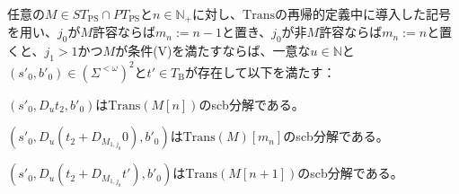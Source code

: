\documentclass[dvipdfmx,uplatex]{jsarticle}
\theoremstyle{customnonumberbreakfortheorem}
\theoremstyle{customnonumberbreakforproof}
\begin{document}
\begin{lemma}[条件(V)の下での基本列のscb分解]\label{条件(V)の下での基本列のscb分解}
	任意の\(M \in ST_{\textrm{PS}} \cap PT_{\textrm{PS}}\)と\(n \in \mathbb{N}_{+}\)に対し、\(\textrm{Trans}\)の再帰的定義中に導入した記号を用い、\(j_0\)が\(M\)許容ならば\(m_n := n-1\)と置き、\(j_0\)が非\(M\)許容ならば\(m_n := n\)と置くと、\(j_1 > 1\)かつ\(M\)が条件(V)を満たすならば\footnotemark{}、一意な\(u \in \mathbb{N}\)と\((s'_0,b'_0) \in (\Sigma^{< \omega})^2\)と\(t' \in T_{\textrm{B}}\)が存在して以下を満たす：
	\begin{penumerate}
		\item \((s'_0,D_u t_2,b'_0)\)は\(\textrm{Trans}(M[n])\)のscb分解である。
		\item \((s'_0,D_u(t_2 + D_{M_{1,j_0}} 0),b'_0)\)は\(\textrm{Trans}(M)[m_n]\)のscb分解である。
		\item \((s'_0,D_u(t_2 + D_{M_{1,j_0}} t'),b'_0)\)は\(\textrm{Trans}(M[n+1])\)のscb分解である。
	\end{penumerate}
\end{lemma}
\end{document}
